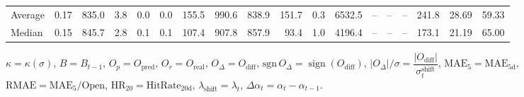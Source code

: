 \begin{threeparttable}
{\begin{tabular}{lrrrrrrrrrrrrrrrrr}
Average &     0.17 & 835.0 &               3.8 &               0.0 &                0.0 &              155.5 &  990.6 & 838.9 &      151.7 &                      0.3 &              6532.5 &         -- &        -- &             -- &            241.8 &           28.69 &                  59.33 \\
 Median &     0.15 & 845.7 &               2.8 &               0.1 &                0.1 &              107.4 &  907.8 & 857.9 &       93.4 &                      1.0 &              4196.4 &         -- &        -- &             -- &            173.1 &           21.19 &                  65.00 \\
\bottomrule
\end{tabular}
}
\begin{tablenotes}\footnotesize
\item $\kappa=\kappa(\sigma)$, $B=B_{t-1}$, $O_p=O_{\text{pred}}$, $O_r=O_{\text{real}}$, $O_\Delta=O_{\text{diff}}$, $\mathrm{sgn}\,O_\Delta=\operatorname{sign}(O_{\text{diff}})$, $|O_\Delta|/\sigma=\dfrac{|O_{\text{diff}}|}{\sigma_t^{\text{shift}}}$, $\mathrm{MAE}_5=\mathrm{MAE}_{5\text{d}}$, $\mathrm{RMAE}= \mathrm{MAE}_5 / \text{Open}$, $\mathrm{HR}_{20}=\mathrm{HitRate}_{20\text{d}}$, 
$\lambda_{\text{shift}}=\lambda_t$, 
$\Delta\alpha_t=\alpha_t-\alpha_{t-1}$.
\end{tablenotes}
\end{threeparttable}
\endgroup

